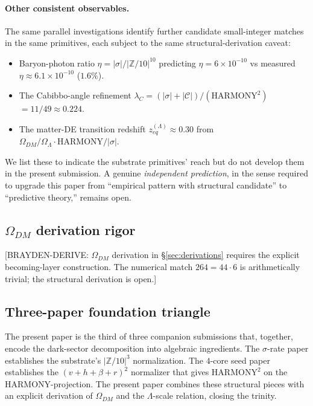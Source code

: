 \documentclass[11pt,reqno]{amsart}
\theoremstyle{plain}
\theoremstyle{definition}
\theoremstyle{remark}
\newcommand{\Z}{\mathbb{Z}}
\begin{document}
\paragraph{Other consistent observables.}
The same parallel investigations identify further candidate
small-integer matches in the same primitives, each subject to
the same structural-derivation caveat:
\begin{itemize}
\item Baryon-photon ratio $\eta = |\sigma|/|\Z/10|^{10}$
predicting $\eta = 6 \times 10^{-10}$ vs measured
$\eta \approx 6.1 \times 10^{-10}$ ($1.6\%$).
\item The Cabibbo-angle refinement
$\lambda_C = (|\sigma| + |\mathcal{C}|)/(\mathrm{HARMONY}^2)$
$= 11/49 \approx 0.224$.
\item The matter-DE transition redshift $z_{eq}^{(\Lambda)}
\approx 0.30$ from $\Omega_{DM}/\Omega_\Lambda \cdot
\mathrm{HARMONY}/|\sigma|$.
\end{itemize}
We list these to indicate the substrate primitives' reach but do
not develop them in the present submission. A genuine
\emph{independent prediction}, in the sense required to upgrade
this paper from ``empirical pattern with structural candidate''
to ``predictive theory,'' remains open.

\subsection{$\Omega_{DM}$ derivation rigor}

[BRAYDEN-DERIVE: $\Omega_{DM}$ derivation in
\S\ref{sec:derivations} requires the explicit becoming-layer
construction. The numerical match $264 = 44 \cdot 6$ is
arithmetically trivial; the structural derivation is open.]

\subsection{Three-paper foundation triangle}

The present paper is the third of three companion submissions
that, together, encode the dark-sector decomposition into
algebraic ingredients. The $\sigma$-rate paper
\cite{SandersGish2026JCAP} establishes the substrate's
$|\Z/10|^{3}$ normalization. The $4$-core seed paper
\cite{SandersGish2026FourCore} establishes the
$(v + h + \beta + r)^{2}$ normalizer that gives
$\mathrm{HARMONY}^{2}$ on the $\mathrm{HARMONY}$-projection. The
present paper combines these structural pieces with an explicit
derivation of $\Omega_{DM}$ and the $\Lambda$-scale relation,
closing the trinity.
\end{document}
